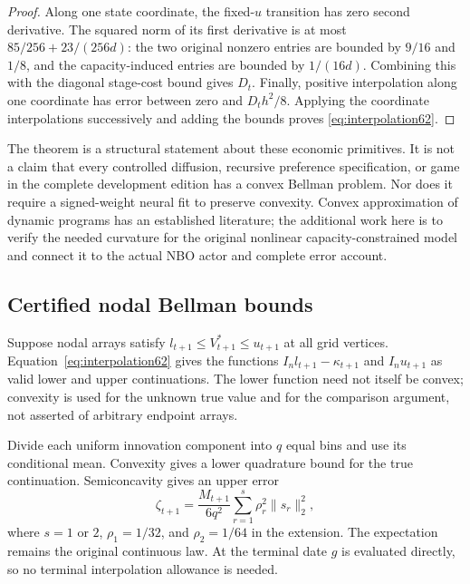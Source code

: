 \begin{proof}
Along one state coordinate, the fixed-$u$ transition has zero second derivative. The squared norm of its first derivative is at most $85/256+23/(256d)$: the two original nonzero entries are bounded by $9/16$ and $1/8$, and the capacity-induced entries are bounded by $1/(16d)$. Combining this with the diagonal stage-cost bound gives $D_t$. Finally, positive interpolation along one coordinate has error between zero and $D_t h^2/8$. Applying the coordinate interpolations successively and adding the bounds proves \eqref{eq:interpolation62}.
\end{proof}

The theorem is a structural statement about these economic primitives. It is not a claim that every controlled diffusion, recursive preference specification, or game in the complete development edition has a convex Bellman problem. Nor does it require a signed-weight neural fit to preserve convexity. Convex approximation of dynamic programs has an established literature; the additional work here is to verify the needed curvature for the original nonlinear capacity-constrained model and connect it to the actual NBO actor and complete error account.

\subsection{Certified nodal Bellman bounds}
Suppose nodal arrays satisfy $l_{t+1}\le V_{t+1}^*\le u_{t+1}$ at all grid vertices. Equation~\eqref{eq:interpolation62} gives the functions $I_nl_{t+1}-\kappa_{t+1}$ and $I_nu_{t+1}$ as valid lower and upper continuations. The lower function need not itself be convex; convexity is used for the unknown true value and for the comparison argument, not asserted of arbitrary endpoint arrays.

Divide each uniform innovation component into $q$ equal bins and use its conditional mean. Convexity gives a lower quadrature bound for the true continuation. Semiconcavity gives an upper error
\begin{equation}\label{eq:quadrature62}
 \zeta_{t+1}=\frac{M_{t+1}}{6q^2}
                      \sum_{r=1}^{s}\rho_r^2\|s_r\|_2^2,
\end{equation}
where $s=1$ or $2$, $\rho_1=1/32$, and $\rho_2=1/64$ in the extension. The expectation remains the original continuous law. At the terminal date $g$ is evaluated directly, so no terminal interpolation allowance is needed.

